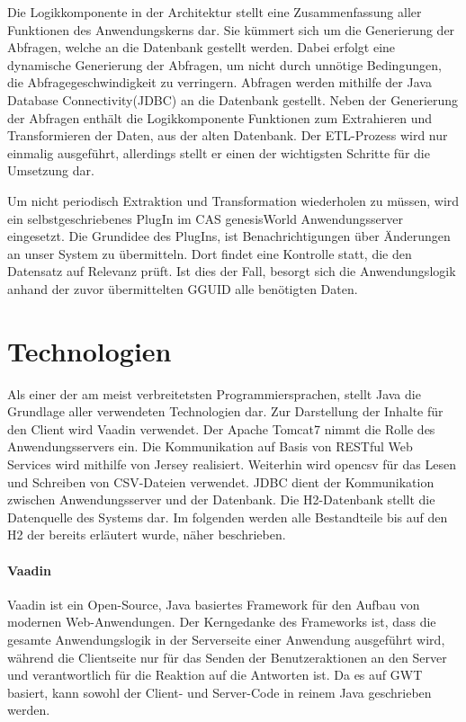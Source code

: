 Die Logikkomponente in der Architektur stellt eine Zusammenfassung aller Funktionen des Anwendungskerns dar. Sie kümmert sich um die Generierung der Abfragen, welche an die Datenbank gestellt werden. Dabei erfolgt eine dynamische Generierung der Abfragen, um nicht durch unnötige Bedingungen, die Abfragegeschwindigkeit zu verringern. Abfragen werden mithilfe der Java Database Connectivity(JDBC) an die Datenbank gestellt. Neben der Generierung der Abfragen enthält die Logikkomponente Funktionen zum Extrahieren und Transformieren der Daten, aus der alten Datenbank. Der ETL-Prozess wird nur einmalig ausgeführt, allerdings stellt er einen der wichtigsten Schritte für die Umsetzung dar. 

Um nicht periodisch Extraktion und Transformation wiederholen zu müssen, wird ein selbstgeschriebenes PlugIn im CAS genesisWorld Anwendungsserver eingesetzt. Die Grundidee des PlugIns, ist Benachrichtigungen über Änderungen an unser System zu übermitteln. Dort findet eine Kontrolle statt, die den Datensatz auf Relevanz prüft. Ist dies der Fall, besorgt sich die Anwendungslogik anhand der zuvor übermittelten GGUID alle benötigten Daten.

\section{Technologien}

Als einer der am meist verbreitetsten Programmiersprachen, stellt Java die Grundlage aller verwendeten Technologien dar. Zur Darstellung der Inhalte für den Client wird Vaadin verwendet. Der Apache Tomcat7 nimmt die Rolle des Anwendungsservers ein. Die Kommunikation auf Basis von RESTful Web Services wird mithilfe von Jersey realisiert. Weiterhin wird opencsv für das Lesen und Schreiben von CSV-Dateien verwendet. JDBC dient der Kommunikation zwischen Anwendungsserver und der Datenbank. Die H2-Datenbank stellt die Datenquelle des Systems dar. Im folgenden werden alle Bestandteile bis auf den H2 der bereits erläutert wurde, näher beschrieben. 

\paragraph{Vaadin}

Vaadin ist ein Open-Source, Java basiertes Framework für den Aufbau von modernen Web-Anwendungen. Der Kerngedanke des Frameworks ist, dass die gesamte Anwendungslogik in der Serverseite einer Anwendung ausgeführt wird, während die Clientseite nur für das Senden der Benutzeraktionen an den Server und verantwortlich für die Reaktion auf die Antworten ist. Da es auf GWT basiert, kann sowohl der Client- und Server-Code in reinem Java geschrieben werden.

